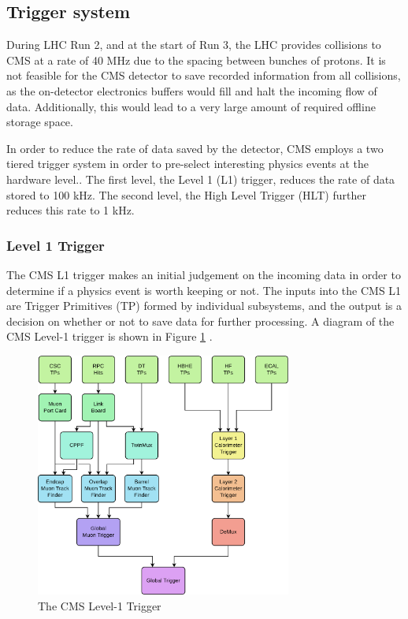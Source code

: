 \subsection{Trigger system}

During LHC Run 2, and at the start of Run 3, the LHC provides collisions to CMS at a rate of 40 MHz due to the spacing between bunches of protons. It is not feasible for the CMS detector to save recorded information from all collisions, as the on-detector electronics buffers would fill and halt the incoming flow of data. Additionally, this would lead to a very large amount of required offline storage space. 

In order to reduce the rate of data saved by the detector, CMS employs a two tiered trigger system in order to pre-select interesting physics events at the hardware level.. The first level, the Level 1 (L1) trigger, reduces the rate of data stored to 100 kHz. The second level, the High Level Trigger (HLT) further reduces this rate to 1 kHz. 

\subsubsection{Level 1 Trigger}

The CMS L1 trigger makes an initial judgement on the incoming data in order to determine if a physics event is worth keeping or not. The inputs into the CMS L1 are Trigger Primitives (TP) formed by individual subsystems, and the output is a decision on whether or not to save data for further processing. A diagram of the CMS Level-1 trigger is shown in Figure \ref{fig:CMS_L1_Trigger} \cite{Sirunyan_2020}.

\begin{figure}[H]
    \centering
    \includegraphics[width=0.75\textwidth]{Images/Trigger/CMS_L1_Trigger.pdf}
    \caption{The CMS Level-1 Trigger}
    \label{fig:CMS_L1_Trigger}
\end{figure}

